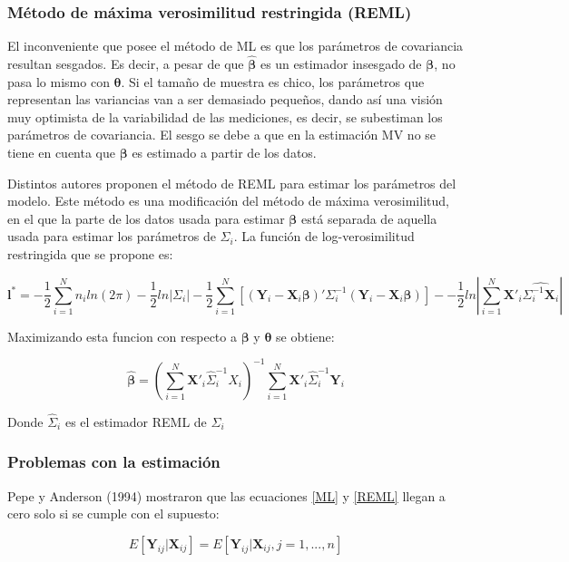 \documentclass[spanish]{article}
\numberwithin{figure}{subsection}
\numberwithin{equation}{subsection}
\numberwithin{table}{subsection}
\begin{document}
\subsubsection{Método de máxima verosimilitud restringida (REML)}

El inconveniente que posee el método de ML es que los parámetros de covariancia
resultan sesgados. Es decir, a pesar de que $\bm{\hat{\beta}}$ es un estimador
insesgado de $\bm{\beta}$, no pasa lo mismo con $\bm{\theta}$. Si el tamaño de
muestra es chico, los parámetros que representan las variancias van a ser
demasiado pequeños, dando así una visión muy optimista de la variabilidad de las
mediciones, es decir, se subestiman los parámetros de covariancia. El sesgo se
debe a que en la estimación MV no se tiene en cuenta que $\bm{\beta}$ es
estimado a partir de los datos.

Distintos autores proponen el método de REML para estimar los parámetros del
modelo. Este método es una modificación del método de máxima verosimilitud, en
el que la parte de los datos usada para estimar $\bm{\beta}$ está separada de
aquella usada para estimar los parámetros de $\bm{\varSigma}_i$. La función de
log-verosimilitud restringida que se propone es:

\begin{equation}
\label{REML}
	\bm{l}^* = -\frac{1}{2} \sum_{i=1}^{N}n_i ln(2\pi) - \frac{1}{2}ln|\bm{\varSigma}_i| -
	\frac{1}{2} \sum_{i=1}^{N} [(\bm{Y}_i - \bm{X}_i\bm{\beta})'
	\bm{\varSigma}_i^{-1} (\bm{Y}_i - \bm{X}_i\bm{\beta})] -
	- \frac{1}{2} ln |\sum_{i=1}^{N} \bm{X}'_i \hat{\bm{\varSigma}_i^{-1} \bm{X}_i}|
\end{equation}

Maximizando esta funcion con respecto a $\bm{\beta}$ y $\bm{\theta}$ se obtiene:

\[ \hat{\bm{\beta}} = (\sum_{i=1}^{N} \bm{X}'_i \hat{\bm{\varSigma}}_i^{-1} X_i)^{-1}
\sum_{i=1}^{N} \bm{X}'_i \hat{\bm{\varSigma}}_i^{-1} \bm{Y}_i\]

Donde $\hat{\bm{\varSigma}}_i$ es el estimador REML de ${\bm{\varSigma}_i}$

\subsubsection{Problemas con la estimación}

Pepe y Anderson (1994) mostraron que las ecuaciones \ref{ML} y \ref{REML} llegan a cero
solo si se cumple con el supuesto:

\begin{equation}
\label{estimation_issue}
	E[\bm{Y}_{ij} | \bm{X}_{ij}] = E[\bm{Y}_{ij} | \bm{X}_{ij}, j = 1, ..., n]
\end{equation}
\end{document}
